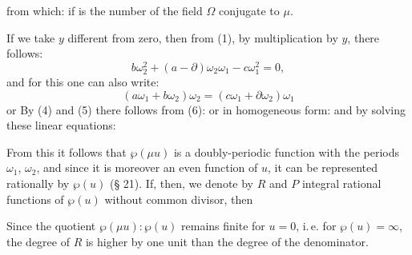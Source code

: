 
from which:
if
is the number of the field $\Omega$ conjugate to $\mu$.

If we take $y$ different from zero, then from (1), by multiplication by $y$, there follows:
\[ b\omega_2^2 + (a-\partial)\omega_2\omega_1 - c\omega_1^2 = 0, \]
and for this one can also write:
\[ (a\omega_1 + b\omega_2)\omega_2 = (c\omega_1 + \partial\omega_2)\omega_1 \]
or
By (4) and (5) there follows from (6):
or in homogeneous form:
and by solving these linear equations:

From this it follows that $\wp(\mu u)$ is a doubly-periodic function with the periods $\omega_1$, $\omega_2$, and since it is moreover an even function of $u$, it can be represented rationally by $\wp(u)$ (§ 21). If, then, we denote by $R$ and $P$ integral rational functions of $\wp(u)$ without common divisor, then

Since the quotient $\wp(\mu u):\wp(u)$ remains finite for $u=0$, i.\,e. for $\wp(u)=\infty$, the degree of $R$ is higher by one unit than the degree of the denominator.
